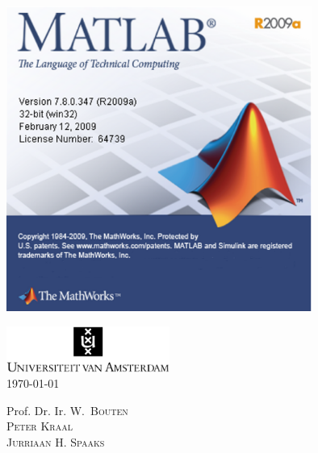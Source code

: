 \begin{titlepage}
\begin{minipage}{0.3\textwidth}
\begin{center}
\end{center}
\end{minipage}
\begin{minipage}{0.7\textwidth}
\begin{center}
\includegraphics[width=0.75\textwidth]{./../eps/matlab-about}\\[1cm]
\end{center}
\vfill
\end{minipage}


\vspace{3em}
\begin{center}
\includegraphics[width=0.4\textwidth]{./../eps/logo}\\[1cm] 
{\small \today}
\end{center}
\vfill
\begin{minipage}{0.99\textwidth}
\begin{flushright} \large
Prof. Dr. Ir. \textsc{W.~Bouten}\\
\vspace{0.5em}
\textsc{Peter Kraal}\\
\vspace{0.5em}
\textsc{Jurriaan H. Spaaks}\\
\end{flushright}
\end{minipage}
 
\end{titlepage}
